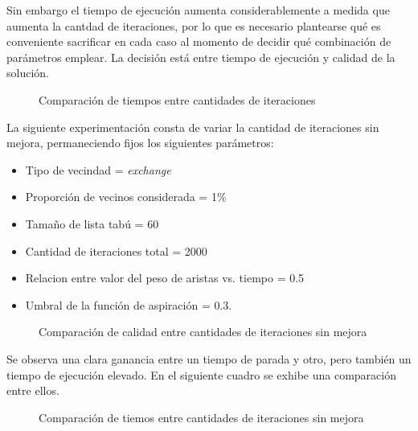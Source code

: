 Sin embargo el tiempo de ejecución aumenta considerablemente a medida que
aumenta la cantdad de iteraciones, por lo que es necesario plantearse qué
es conveniente sacrificar en cada caso al momento de decidir qué combinación
de parámetros emplear. La decisión está entre tiempo de ejecución y calidad de
la solución.

\begin{figure}[H]
    \centering
    \caption{Comparación de tiempos entre cantidades de iteraciones}
    \pgfplotstabletypeset[
        columns={0, localsearchtime, lowiterationlowaspirationtime, highiterationlowaspirationtime, nolimititerationlowaspirationtime}
    ]{\optimalsolutions}
\end{figure}

La siguiente experimentación consta de variar la cantidad de iteraciones
sin mejora, permaneciendo fijos los siguientes parámetros:

\begin{itemize}
\item Tipo de vecindad = \textit{exchange}
\item Proporción de vecinos considerada = 1\%
\item Tamaño de lista tabú = 60
\item Cantidad de iteraciones total = 2000
\item Relacion entre valor del peso de aristas vs. tiempo = 0.5
\item Umbral de la función de aspiración = 0.3.
\end{itemize}

\begin{figure}[H]
    \centering
    \caption{Comparación de calidad entre cantidades de iteraciones sin mejora}
    \pgfplotstabletypeset[
        columns={0, solutions, localsearch, highiterationlowernogainlowaspiration, highiterationhighnogainlowaspiration}
    ]{\optimalsolutions}
\end{figure}

Se observa una clara ganancia entre un tiempo de parada y otro, pero también
un tiempo de ejecución elevado. En el siguiente cuadro se exhibe una
comparación entre ellos.

\begin{figure}[H]
    \centering
    \caption{Comparación de tiemos entre cantidades de iteraciones sin mejora}
    \pgfplotstabletypeset[
        columns={0, localsearchtime, highiterationlowernogainlowaspirationtime, highiterationhighnogainlowaspirationtime, rationogaintime}
    ]{\optimalsolutions}
\end{figure}